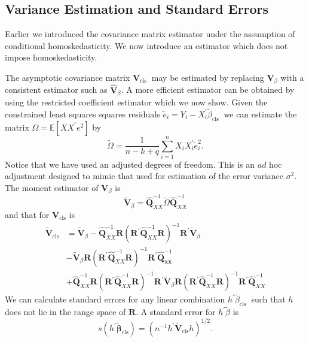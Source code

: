 \documentclass[10pt]{article}
\begin{document}
\subsection{Variance Estimation and Standard Errors}
Earlier we introduced the covariance matrix estimator under the assumption of conditional homoskedasticity. We now introduce an estimator which does not impose homoskedasticity.

The asymptotic covariance matrix $\boldsymbol{V}_{\text {cls }}$ may be estimated by replacing $\boldsymbol{V}_{\beta}$ with a consistent estimator such as $\widehat{\boldsymbol{V}}_{\beta}$. A more efficient estimator can be obtained by using the restricted coefficient estimator which we now show. Given the constrained least squares squares residuals $\widetilde{e}_{i}=Y_{i}-X_{i}^{\prime} \widetilde{\beta}_{\text {cls }}$ we can estimate the matrix $\Omega=\mathbb{E}\left[X X^{\prime} e^{2}\right]$ by
$$
\widetilde{\Omega}=\frac{1}{n-k+q} \sum_{i=1}^{n} X_{i} X_{i}^{\prime} \widetilde{e}_{i}^{2} .
$$
Notice that we have used an adjusted degrees of freedom. This is an $a d$ hoc adjustment designed to mimic that used for estimation of the error variance $\sigma^{2}$. The moment estimator of $\boldsymbol{V}_{\beta}$ is
$$
\widetilde{\boldsymbol{V}}_{\beta}=\widehat{\boldsymbol{Q}}_{X X}^{-1} \widetilde{\Omega} \widehat{\boldsymbol{Q}}_{X X}^{-1}
$$
and that for $\boldsymbol{V}_{\mathrm{cls}}$ is
$$
\begin{aligned}
\widetilde{\boldsymbol{V}}_{\mathrm{cls}} &=\widetilde{\boldsymbol{V}}_{\beta}-\widehat{\boldsymbol{Q}}_{X X}^{-1} \boldsymbol{R}\left(\boldsymbol{R}^{\prime} \widehat{\boldsymbol{Q}}_{X X}^{-1} \boldsymbol{R}\right)^{-1} \boldsymbol{R}^{\prime} \widetilde{\boldsymbol{V}}_{\beta} \\
&-\widetilde{\boldsymbol{V}}_{\beta} \boldsymbol{R}\left(\boldsymbol{R}^{\prime} \widehat{\boldsymbol{Q}}_{X X}^{-1} \boldsymbol{R}\right)^{-1} \boldsymbol{R}^{\prime} \widehat{\boldsymbol{Q}}_{\boldsymbol{x x}}^{-1} \\
&+\widehat{\boldsymbol{Q}}_{X X}^{-1} \boldsymbol{R}\left(\boldsymbol{R}^{\prime} \widehat{\boldsymbol{Q}}_{X X}^{-1} \boldsymbol{R}\right)^{-1} \boldsymbol{R}^{\prime} \widetilde{\boldsymbol{V}}_{\beta} \boldsymbol{R}\left(\boldsymbol{R}^{\prime} \widehat{\boldsymbol{Q}}_{X X}^{-1} \boldsymbol{R}\right)^{-1} \boldsymbol{R}^{\prime} \widehat{\boldsymbol{Q}}_{X X}^{-1}
\end{aligned}
$$
We can calculate standard errors for any linear combination $h^{\prime} \widetilde{\beta}_{\text {cls }}$ such that $h$ does not lie in the range space of $\boldsymbol{R}$. A standard error for $h^{\prime} \widetilde{\beta}$ is
$$
s\left(h^{\prime} \widetilde{\boldsymbol{\beta}}_{\mathrm{cls}}\right)=\left(n^{-1} h^{\prime} \tilde{\boldsymbol{V}}_{\mathrm{cls}} h\right)^{1 / 2} .
$$
\end{document}
